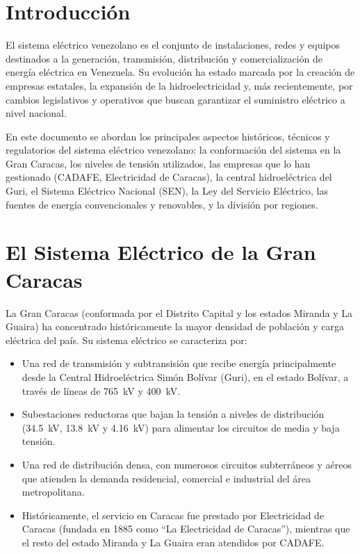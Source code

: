 \documentclass[12pt,a4paper]{article}
\begin{document}


\tableofcontents
\newpage

\section{Introducción}

El sistema eléctrico venezolano es el conjunto de instalaciones, redes y
equipos destinados a la generación, transmisión, distribución y
comercialización de energía eléctrica en Venezuela. Su evolución ha estado
marcada por la creación de empresas estatales, la expansión de la
hidroelectricidad y, más recientemente, por cambios legislativos y
operativos que buscan garantizar el suministro eléctrico a nivel nacional.

En este documento se abordan los principales aspectos históricos,
técnicos y regulatorios del sistema eléctrico venezolano: la
conformación del sistema en la Gran Caracas, los niveles de tensión
utilizados, las empresas que lo han gestionado (CADAFE, Electricidad de
Caracas), la central hidroeléctrica del Guri, el Sistema Eléctrico
Nacional (SEN), la Ley del Servicio Eléctrico, las fuentes de energía
convencionales y renovables, y la división por regiones.

\section{El Sistema Eléctrico de la Gran Caracas}

La Gran Caracas (conformada por el Distrito Capital y los estados Miranda
y La Guaira) ha concentrado históricamente la mayor densidad de
población y carga eléctrica del país. Su sistema eléctrico se caracteriza
por:

\begin{itemize}[nosep]
    \item Una red de transmisión y subtransisión que recibe energía
          principalmente desde la Central Hidroeléctrica Simón Bolívar
          (Guri), en el estado Bolívar, a través de líneas de
          \SI{765}{\kilo\volt} y \SI{400}{\kilo\volt}.
    \item Subestaciones reductoras que bajan la tensión a niveles de
          distribución (\SI{34.5}{\kilo\volt}, \SI{13.8}{\kilo\volt} y
          \SI{4.16}{\kilo\volt}) para alimentar los circuitos de
          media y baja tensión.
    \item Una red de distribución densa, con numerosos circuitos
          subterráneos y aéreos que atienden la demanda residencial,
          comercial e industrial del área metropolitana.
    \item Históricamente, el servicio en Caracas fue prestado por
          Electricidad de Caracas (fundada en 1885 como ``La
          Electricidad de Caracas''), mientras que el resto del estado
          Miranda y La Guaira eran atendidos por CADAFE.
\end{itemize}
\end{document}

